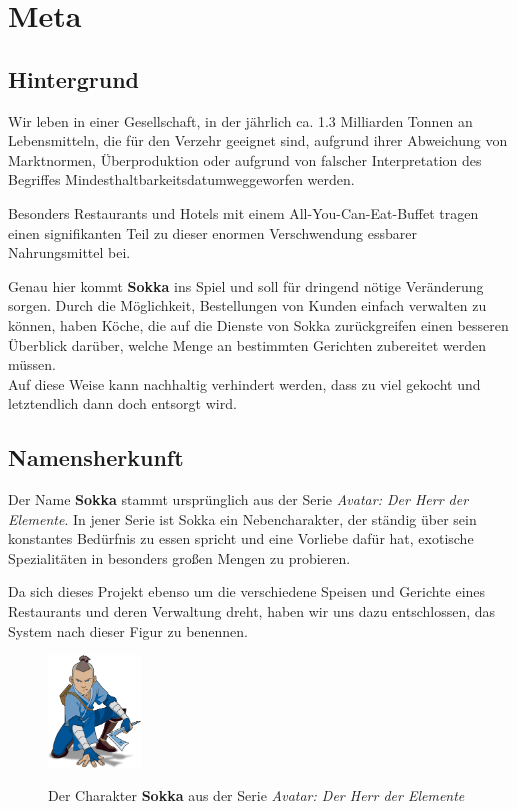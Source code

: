 \chapter{Meta}

\section{Hintergrund}

Wir leben in einer Gesellschaft, in der jährlich ca. 1.3 Milliarden Tonnen an Lebensmitteln, die für den Verzehr geeignet sind, aufgrund ihrer Abweichung von Marktnormen, Überproduktion oder aufgrund von falscher Interpretation des Begriffes \glqq Mindesthaltbarkeitsdatum\grqq weggeworfen werden.

Besonders Restaurants und Hotels mit einem All-You-Can-Eat-Buffet tragen einen signifikanten Teil zu dieser enormen Verschwendung essbarer Nahrungsmittel bei.

Genau hier kommt \textbf{Sokka} ins Spiel und soll für dringend nötige Veränderung sorgen. Durch die Möglichkeit, Bestellungen von Kunden einfach verwalten zu können, haben Köche, die auf die Dienste von Sokka zurückgreifen einen besseren Überblick darüber, welche Menge an bestimmten Gerichten zubereitet werden müssen.\\
Auf diese Weise kann nachhaltig verhindert werden, dass zu viel gekocht und letztendlich dann doch entsorgt wird.

\section{Namensherkunft}

Der Name \textbf{Sokka} stammt ursprünglich aus der Serie \textit{Avatar: Der Herr der Elemente}. In jener Serie ist Sokka ein Nebencharakter, der ständig über sein konstantes Bedürfnis zu essen spricht und eine Vorliebe dafür hat, exotische Spezialitäten in besonders großen Mengen zu probieren.

Da sich dieses Projekt ebenso um die verschiedene Speisen und Gerichte eines Restaurants und deren Verwaltung dreht, haben wir uns dazu entschlossen, das System nach dieser Figur zu benennen.

\begin{figure}[H]
    \begin{center}
        \includegraphics[width=0.22\textwidth]{images/Intro/Sokka.png}
        \caption{Der Charakter \textbf{Sokka} aus der Serie \textit{Avatar: Der Herr der Elemente}}
        \cite{nickelodeon2005}
    \end{center}
\end{figure}

